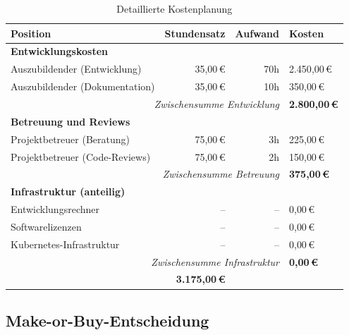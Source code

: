 \begin{table}[H]
\centering
\footnotesize
{}
\begin{tabularx}{\textwidth}{|p{5cm}|r|r|X|}
\hline
\rowcolor{EDAGDunkelgrau!10}
\textbf{Position} & \textbf{Stundensatz} & \textbf{Aufwand} & \textbf{Kosten} \\
\hline

\multicolumn{4}{|l|}{\textbf{Entwicklungskosten}} \\ \hline
Auszubildender (Entwicklung) & 35{,}00\,€\cite{azubi_stundensatz} & 70h & 2.450{,}00\,€ \\ \hline
Auszubildender (Dokumentation) & 35{,}00\,€\cite{azubi_stundensatz} & 10h & 350{,}00\,€ \\ \hline

\multicolumn{3}{|r|}{\textit{Zwischensumme Entwicklung}} & \textbf{2.800{,}00\,€} \\ \hline

\multicolumn{4}{|l|}{\textbf{Betreuung und Reviews}} \\ \hline
Projektbetreuer (Beratung) & 75{,}00\,€\cite{projektbetreuer_stundensatz} & 3h & 225{,}00\,€ \\ \hline
Projektbetreuer (Code-Reviews) & 75{,}00\,€\cite{projektbetreuer_stundensatz} & 2h & 150{,}00\,€ \\ \hline

\multicolumn{3}{|r|}{\textit{Zwischensumme Betreuung}} & \textbf{375{,}00\,€} \\ \hline

\multicolumn{4}{|l|}{\textbf{Infrastruktur (anteilig)}} \\ \hline
Entwicklungsrechner & -- & -- & 0{,}00\,€ \\ \hline
Softwarelizenzen & -- & -- & 0{,}00\,€ \\ \hline
Kubernetes-Infrastruktur & -- & -- & 0{,}00\,€ \\ \hline

\multicolumn{3}{|r|}{\textit{Zwischensumme Infrastruktur}} & \textbf{0{,}00\,€} \\ \hline

\rowcolor{EDAGDunkelgrau!30}
\multicolumn{3}{|r|}{\textbf{Gesamtinvestition}} & \textbf{3.175{,}00\,€} \\ \hline
\end{tabularx}
\caption{Detaillierte Kostenplanung}
\label{tab:kosten_detail}
\end{table}

\subsection{Make-or-Buy-Entscheidung}

